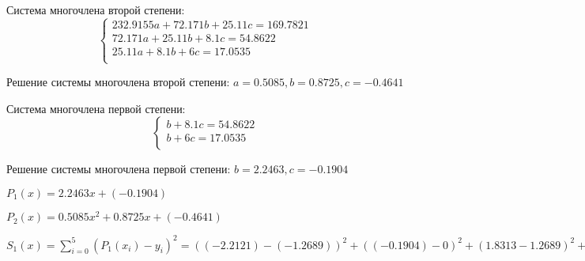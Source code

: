 \documentclass[10pt, a4paper]{scrartcl}
\begin{document}
\vspace{5mm}

Система многочлена второй степени: \[\begin{cases}
232.9155a + 72.171b + 25.11c = 169.7821\\
72.171a + 25.11b + 8.1c = 54.8622\\
25.11a + 8.1b + 6c = 17.0535\\
\end{cases}\]

Решение системы многочлена второй степени:
\(a = 0.5085, b = 0.8725, c = -0.4641\)

Система многочлена первой степени: \[\begin{cases}
b + 8.1c = 54.8622\\
b + 6c = 17.0535\\
\end{cases}\]

Решение системы многочлена первой степени: \(b = 2.2463, c = -0.1904\)

\(\displaystyle P_1(x) = 2.2463x + (-0.1904)\)

\(\displaystyle P_2(x) = 0.5085x^2 + 0.8725x + (-0.4641)\)

\begin{center} 
 \end{center}

\(\displaystyle S_1(x) = \sum_{i=0}^{5}(P_1(x_i) - y_i)^2 = ((-2.2121) - (-1.2689))^2 + ((-0.1904) - 0)^2 + (1.8313 - 1.2689)^2 + (3.8529 - 2.6541)^2 + (5.8746 - 4.4856)^2 + (7.8963 - 9.9138)^2 = 0.8896 + 0.0363 + 0.3163 + 1.4371 + 1.9293 + 4.0703 = 8.6789\)
\end{document}
